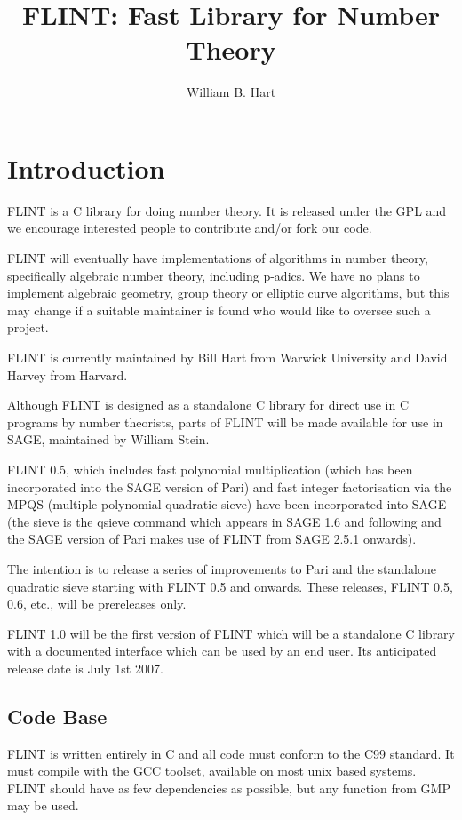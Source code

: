 \documentclass[a4paper,10pt]{article}
\title{FLINT: Fast Library for Number Theory}
\author{William B. Hart}
\begin{document}
\maketitle
\lstset{language=c}
\lstset{escapeinside=\%\%}

\section{Introduction}
FLINT is a C library for doing number theory. It is released under the GPL and we encourage interested people to contribute and/or fork our code.

FLINT will eventually have implementations of algorithms in number theory, specifically algebraic number theory, including p-adics. We have no plans to implement algebraic geometry, group theory or elliptic curve algorithms, but this may change if a suitable maintainer is found who would like to oversee such a project.

FLINT is currently maintained by Bill Hart from Warwick University and David Harvey from Harvard.

Although FLINT is designed as a standalone C library for direct use in C programs by number theorists, parts of FLINT will be made available for use in SAGE, maintained by William Stein. 

FLINT 0.5, which includes fast polynomial multiplication (which has been incorporated into the SAGE version of Pari) and fast integer factorisation via the MPQS (multiple polynomial quadratic sieve) have been incorporated into SAGE (the sieve is the qsieve command which appears in SAGE 1.6 and following and the SAGE version of Pari makes use of FLINT from SAGE 2.5.1 onwards).

The intention is to release a series of improvements to Pari and the standalone quadratic sieve starting with FLINT 0.5 and onwards. These releases, FLINT 0.5, 0.6, etc., will be prereleases only. 

FLINT 1.0 will be the first version of FLINT which will be a standalone C library with a documented interface which can be used by an end user. Its anticipated release date is July 1st 2007. 

\subsection{Code Base}
FLINT is written entirely in C and all code must conform to the C99 standard. It must compile with the GCC toolset, available on most unix based systems. FLINT should have as few dependencies as possible, but any function from GMP may be used.
\end{document}

